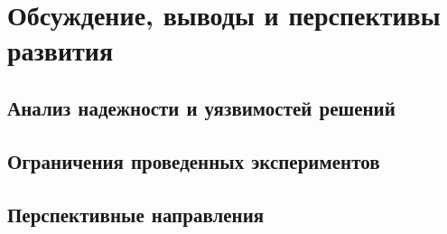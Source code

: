 \chapter{Обсуждение, выводы и перспективы развития}

\section{Анализ надежности и уязвимостей решений}

\section{Ограничения проведенных экспериментов}

\section{Перспективные направления}

